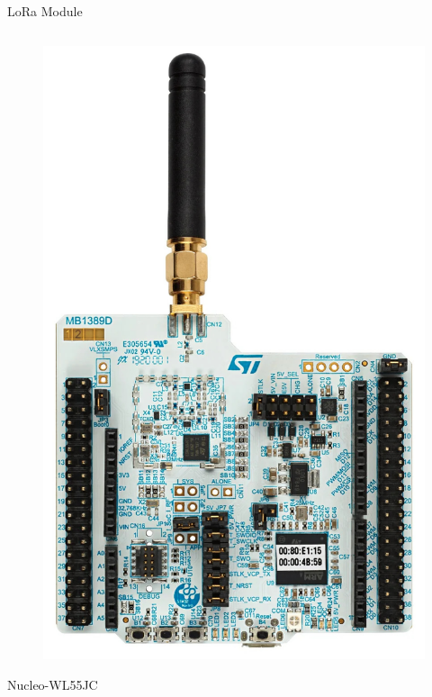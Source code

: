 \documentclass{beamer}
\begin{document}
\begin{frame}{LoRa Module}
\begin{columns}[T]
\begin{column}{.3\textwidth}
\begin{figure}
        \includegraphics[width=\linewidth]{img/nucleo-wl55jc.jpg}
    \end{figure}
    Nucleo-WL55JC
\end{column}
\end{columns}
\end{frame}
\end{document}
